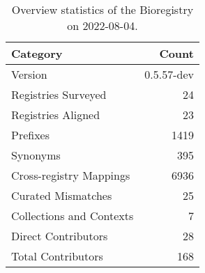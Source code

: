 \begin{table}
\centering
\caption{Overview statistics of the Bioregistry on 2022-08-04.}
\label{tab:bioregistry-summary}
\begin{tabular}{lr}
\toprule
                Category &      Count \\
\midrule
                 Version & 0.5.57-dev \\
     Registries Surveyed &         24 \\
      Registries Aligned &         23 \\
                Prefixes &       1419 \\
                Synonyms &        395 \\
 Cross-registry Mappings &       6936 \\
      Curated Mismatches &         25 \\
Collections and Contexts &          7 \\
     Direct Contributors &         28 \\
      Total Contributors &        168 \\
\bottomrule
\end{tabular}
\end{table}
